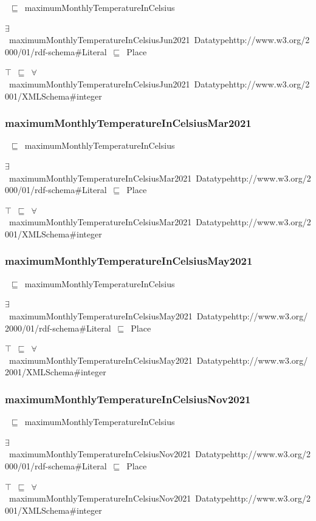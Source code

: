 \documentclass{article}
\begin{document}
~\ensuremath{\sqsubseteq}~maximumMonthlyTemperatureInCelsius

\ensuremath{\exists}~maximumMonthlyTemperatureInCelsiusJun2021~Datatypehttp://www.w3.org/2000/01/rdf-schema#Literal~\ensuremath{\sqsubseteq}~Place

\ensuremath{\top}~\ensuremath{\sqsubseteq}~\ensuremath{\forall}~maximumMonthlyTemperatureInCelsiusJun2021~Datatypehttp://www.w3.org/2001/XMLSchema#integer

\subsubsection*{maximumMonthlyTemperatureInCelsiusMar2021}

~\ensuremath{\sqsubseteq}~maximumMonthlyTemperatureInCelsius

\ensuremath{\exists}~maximumMonthlyTemperatureInCelsiusMar2021~Datatypehttp://www.w3.org/2000/01/rdf-schema#Literal~\ensuremath{\sqsubseteq}~Place

\ensuremath{\top}~\ensuremath{\sqsubseteq}~\ensuremath{\forall}~maximumMonthlyTemperatureInCelsiusMar2021~Datatypehttp://www.w3.org/2001/XMLSchema#integer

\subsubsection*{maximumMonthlyTemperatureInCelsiusMay2021}

~\ensuremath{\sqsubseteq}~maximumMonthlyTemperatureInCelsius

\ensuremath{\exists}~maximumMonthlyTemperatureInCelsiusMay2021~Datatypehttp://www.w3.org/2000/01/rdf-schema#Literal~\ensuremath{\sqsubseteq}~Place

\ensuremath{\top}~\ensuremath{\sqsubseteq}~\ensuremath{\forall}~maximumMonthlyTemperatureInCelsiusMay2021~Datatypehttp://www.w3.org/2001/XMLSchema#integer

\subsubsection*{maximumMonthlyTemperatureInCelsiusNov2021}

~\ensuremath{\sqsubseteq}~maximumMonthlyTemperatureInCelsius

\ensuremath{\exists}~maximumMonthlyTemperatureInCelsiusNov2021~Datatypehttp://www.w3.org/2000/01/rdf-schema#Literal~\ensuremath{\sqsubseteq}~Place

\ensuremath{\top}~\ensuremath{\sqsubseteq}~\ensuremath{\forall}~maximumMonthlyTemperatureInCelsiusNov2021~Datatypehttp://www.w3.org/2001/XMLSchema#integer
\end{document}
